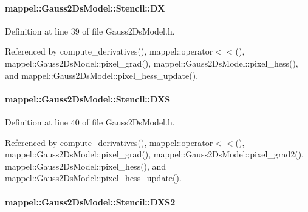 \paragraph[{\texorpdfstring{DX}{DX}}]{ mappel\+::\+Gauss2\+Ds\+Model\+::\+Stencil\+::\+DX}\hypertarget{classmappel_1_1Gauss2DsModel_1_1Stencil_a6b89ca29dba3693054fff92b6ecfc59c}{}\label{classmappel_1_1Gauss2DsModel_1_1Stencil_a6b89ca29dba3693054fff92b6ecfc59c}


Definition at line 39 of file Gauss2\+Ds\+Model.\+h.



Referenced by compute\+\_\+derivatives(), mappel\+::operator$<$$<$(), mappel\+::\+Gauss2\+Ds\+Model\+::pixel\+\_\+grad(), mappel\+::\+Gauss2\+Ds\+Model\+::pixel\+\_\+hess(), and mappel\+::\+Gauss2\+Ds\+Model\+::pixel\+\_\+hess\+\_\+update().

\paragraph[{\texorpdfstring{D\+XS}{DXS}}]{ mappel\+::\+Gauss2\+Ds\+Model\+::\+Stencil\+::\+D\+XS}\hypertarget{classmappel_1_1Gauss2DsModel_1_1Stencil_aa10f9d644846ea246832b3850707b700}{}\label{classmappel_1_1Gauss2DsModel_1_1Stencil_aa10f9d644846ea246832b3850707b700}


Definition at line 40 of file Gauss2\+Ds\+Model.\+h.



Referenced by compute\+\_\+derivatives(), mappel\+::operator$<$$<$(), mappel\+::\+Gauss2\+Ds\+Model\+::pixel\+\_\+grad(), mappel\+::\+Gauss2\+Ds\+Model\+::pixel\+\_\+grad2(), mappel\+::\+Gauss2\+Ds\+Model\+::pixel\+\_\+hess(), and mappel\+::\+Gauss2\+Ds\+Model\+::pixel\+\_\+hess\+\_\+update().

\paragraph[{\texorpdfstring{D\+X\+S2}{DXS2}}]{ mappel\+::\+Gauss2\+Ds\+Model\+::\+Stencil\+::\+D\+X\+S2}\hypertarget{classmappel_1_1Gauss2DsModel_1_1Stencil_a96208f4eb9459d411a4731f6fb6f92cc}{}\label{classmappel_1_1Gauss2DsModel_1_1Stencil_a96208f4eb9459d411a4731f6fb6f92cc}


